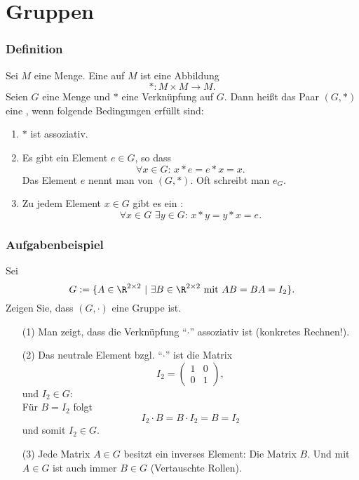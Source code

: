 \section{Gruppen}
%
%
\begin{frame}\frametitle{Definition}

	Sei $M$ eine Menge. Eine  auf $M$ ist eine Abbildung
	$$
		\ast: M \times M \to M.
	$$\pause
Seien $G$ eine Menge und $\ast$ eine Verknüpfung auf $G$.
	Dann hei{\ss}t das Paar $(G,\ast)$ eine , wenn folgende Bedingungen erfüllt sind:
	\begin{enumerate}
		\item $\ast$ ist assoziativ. 
		\item Es gibt ein Element $e\in G$, so dass
			$$
				\forall x\in G:\, x\ast e = e\ast x = x.
			$$
			Das Element $e$ nennt man  von $(G,\ast)$. Oft schreibt man $e_G$. 
		\item Zu jedem Element $x\in G$ gibt es ein :
			$$
				\forall x\in G\,\, \exists y\in G:\, x\ast y = y\ast x = e.
			$$
	\end{enumerate}
	
\end{frame}
%
\begin{frame}\frametitle{Aufgabenbeispiel}
Sei 
$$
	G := \{ A \in \R^{2\times 2}~|~ \exists B \in \R^{2\times 2} \text{ mit } AB=BA=I_2 \}.
$$
Zeigen Sie, dass $(G,\cdot)$ eine Gruppe ist.\\\pause\vfill
{}
		\begin{itemize}
			\item[(1)] Man zeigt, dass die Verkn\"upfung ``$\cdot$'' assoziativ ist (konkretes Rechnen!). 
			\item[(2)] Das neutrale Element bzgl. ``$\cdot$'' ist die Matrix
					$$
						I_2 =
							\begin{pmatrix}
								1	& 0	\\
								0	& 1	
							\end{pmatrix},
					$$
					und $I_2\in G$:\\
					F\"ur $B=I_2$ folgt
					$$
						I_2\cdot B = B\cdot I_2 =B= I_2
					$$
					und somit $I_2\in G$.
			\item[(3)] Jede Matrix $A\in G$ besitzt ein inverses Element: Die Matrix $B$. Und mit $A \in G$ ist auch immer $B\in G$ (Vertauschte Rollen).
		\end{itemize}
\end{frame}
%
